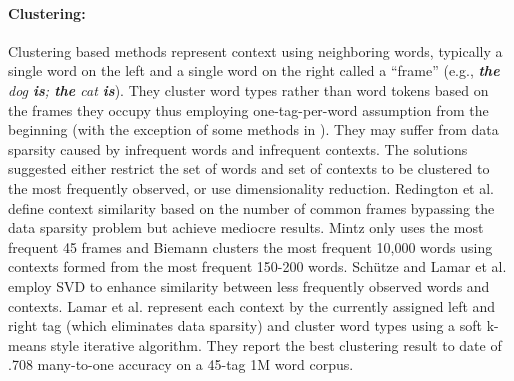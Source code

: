 \documentclass[11pt]{article}
\begin{document}
\paragraph{Clustering:}
Clustering based methods represent context using neighboring words,
typically a single word on the left and a single word on the right
called a ``frame'' (e.g., {\em {\bf the} dog {\bf is}; {\bf the} cat
  {\bf is}}).  They cluster word types rather than word tokens based
on the frames they occupy thus employing one-tag-per-word assumption
from the beginning (with the exception of some methods in
\cite{Schutze:1995:DPT:976973.976994}).  They may suffer from data
sparsity caused by infrequent words and infrequent contexts.  The
solutions suggested either restrict the set of words and set of
contexts to be clustered to the most frequently observed, or use
dimensionality reduction.  Redington et
al.  define context similarity
based on the number of common frames bypassing the data sparsity
problem but achieve mediocre results.  Mintz
 only uses the most frequent 45 frames
and Biemann  clusters the most
frequent 10,000 words using contexts formed from the most frequent
150-200 words.  Sch\"utze 
and Lamar et al.  employ SVD to enhance
similarity between less frequently observed words and contexts.  Lamar
et al.  represent each
context by the currently assigned left and right tag (which eliminates
data sparsity) and cluster word types using a soft k-means style
iterative algorithm.  They report the best clustering result to date
of .708 many-to-one accuracy on a 45-tag 1M word corpus.
\end{document}

